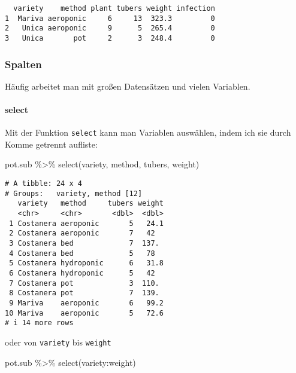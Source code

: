 \documentclass[
  letterpaper,
  DIV=11,
  numbers=noendperiod]{scrartcl}
\let\oldparagraph\paragraph
\renewcommand{\paragraph}[1]{\oldparagraph{#1}\mbox{}}
\newenvironment{Shaded}{\begin{snugshade}}{\end{snugshade}}
\newcommand{\FunctionTok}[1]{\textcolor[rgb]{0.28,0.35,0.67}{#1}}
\newcommand{\NormalTok}[1]{\textcolor[rgb]{0.00,0.23,0.31}{#1}}
\newcommand{\SpecialCharTok}[1]{\textcolor[rgb]{0.37,0.37,0.37}{#1}}
\begin{document}
\begin{verbatim}
  variety    method plant tubers weight infection
1  Mariva aeroponic     6     13  323.3         0
2   Unica aeroponic     9      5  265.4         0
3   Unica       pot     2      3  248.4         0
\end{verbatim}

\hypertarget{spalten}{%
\subsubsection{Spalten}\label{spalten}}

Häufig arbeitet man mit großen Datensätzen und vielen Variablen.

\hypertarget{select}{%
\paragraph{select}\label{select}}

Mit der Funktion \texttt{select} kann man Variablen auswählen, indem ich
sie durch Komme getrennt aufliste:

\begin{Shaded}
\begin{Highlighting}[]
\NormalTok{pot.sub }\SpecialCharTok{\%\textgreater{}\%} \FunctionTok{select}\NormalTok{(variety, method, tubers, weight)}
\end{Highlighting}
\end{Shaded}

\begin{verbatim}
# A tibble: 24 x 4
# Groups:   variety, method [12]
   variety   method     tubers weight
   <chr>     <chr>       <dbl>  <dbl>
 1 Costanera aeroponic       5   24.1
 2 Costanera aeroponic       7   42  
 3 Costanera bed             7  137. 
 4 Costanera bed             5   78  
 5 Costanera hydroponic      6   31.8
 6 Costanera hydroponic      5   42  
 7 Costanera pot             3  110. 
 8 Costanera pot             7  139. 
 9 Mariva    aeroponic       6   99.2
10 Mariva    aeroponic       5   72.6
# i 14 more rows
\end{verbatim}

oder von \texttt{variety} bis \texttt{weight}

\begin{Shaded}
\begin{Highlighting}[]
\NormalTok{pot.sub }\SpecialCharTok{\%\textgreater{}\%} \FunctionTok{select}\NormalTok{(variety}\SpecialCharTok{:}\NormalTok{weight)}
\end{Highlighting}
\end{Shaded}
\end{document}
